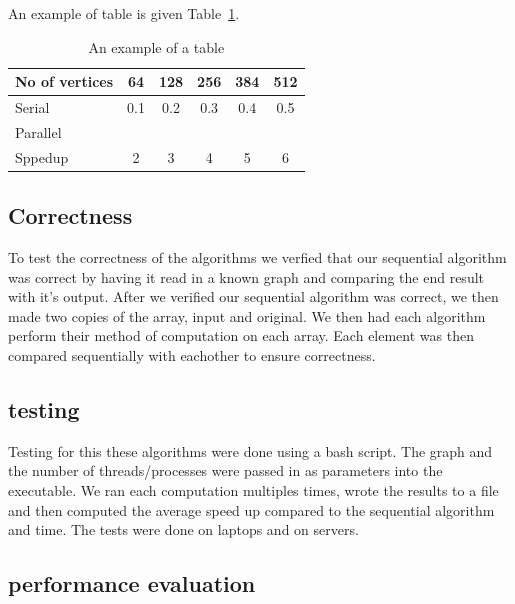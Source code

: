 An example of table is given Table~\ref{tab:example}.
\begin{table}[htb]
	\centering
	\caption{An example of a table}\label{tab:example}
	\begin{tabular}{l|ccccc}
		\toprule
		No of vertices & 64 & 128 & 256 & 384 & 512\\
		\midrule
		Serial &0.1&0.2&0.3&0.4&0.5\\
		Parallel &&&&\\
		Sppedup &2&3&4&5&6\\
		\bottomrule
	\end{tabular}
\end{table} 
\subsection{Correctness}
To test the correctness of the algorithms we verfied that our sequential algorithm was correct by having it read in a known graph and comparing the end result with it's output. After we verified our sequential algorithm was correct, we then made two copies of the array, input and original. We then had each algorithm perform their method of computation on each array. Each element was then compared sequentially with eachother to ensure correctness.
\subsection{testing}
Testing for this these algorithms were done using a bash script. The graph and the number of threads/processes were passed in as parameters into the executable. We ran each computation multiples times, wrote the results to a file and then computed the average speed up compared to the sequential algorithm and time.
The tests were done on laptops and on servers.
\subsection{performance evaluation}
 

